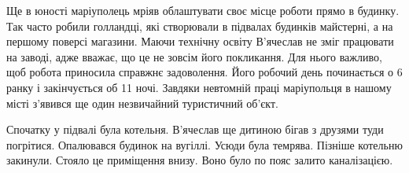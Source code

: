 
Ще в юності маріуполець мріяв облаштувати своє місце роботи прямо в будинку.
Так часто робили голландці, які створювали в підвалах будинків майстерні, а на
першому поверсі магазини. Маючи технічну освіту В'ячеслав не зміг працювати на
заводі, адже вважає, що це не зовсім його покликання. Для нього важливо, щоб
робота приносила справжнє задоволення. Його робочий день починається о 6 ранку
і закінчується об 11 ночі. Завдяки невтомній праці маріупольця в нашому місті
з'явився ще один незвичайний туристичний об'єкт.

Спочатку у підвалі була котельня. В'ячеслав ще дитиною бігав з друзями туди
погрітися. Опалювався будинок на вугіллі. Усюди була темрява. Пізніше котельню
закинули. Стояло це приміщення внизу. Воно було по пояс залито каналізацією.


